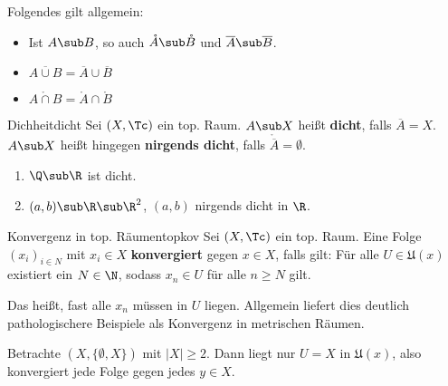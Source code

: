 \begin{bemerkung}
Folgendes gilt allgemein:
\begin{itemize}
\item Ist $A \sub B$, so auch $\mathring{A} \sub \mathring{B}$ und $\overline{A} \sub \overline{B}$.
\item $\overline{A \cup B} = \overline{A} \cup \overline{B}$
\item $\mathring{A \cap B} = \mathring{A} \cap \mathring{B}$
\end{itemize}
\end{bemerkung}
\begin{definition}{Dichheit}{dicht}
Sei $(X, \Tc)$ ein top. Raum. $A \sub X$ heißt \textbf{dicht}, falls $\overline{A} = X$. $A\sub X$ heißt hingegen \textbf{nirgends dicht}, falls $\mathring{\overline{A}}= \emptyset$.
\end{definition}
\begin{beispiele}
\begin{enumerate}
\item $\Q \sub \R$ ist dicht.
\item $(a,b) \sub \R \sub \R^2$, $(a,b)$ nirgends dicht in $\R$.
\end{enumerate}
\end{beispiele}
\begin{definition}{Konvergenz in top. Räumen}{topkov}
Sei $(X, \Tc)$ ein top. Raum. Eine Folge $(x_i)_{i \in N}$ mit $x_i \in X$ \textbf{konvergiert} gegen $x \in X$, falls gilt:
Für alle $U \in \mathfrak{U}(x)$ existiert ein $N \in \N$, sodass $x_n \in U$ für alle $n \geq N$ gilt.
\end{definition}
Das heißt, fast alle $x_n$ müssen in $U$ liegen. Allgemein liefert dies deutlich pathologischere Beispiele als Konvergenz in metrischen Räumen.
\begin{beispiel}
Betrachte $(X, \{\emptyset, X\})$ mit $|X| \geq 2$. Dann liegt nur $U=X$ in $\mathfrak{U}(x)$, also konvergiert jede Folge gegen jedes $y \in X$.
\end{beispiel}
